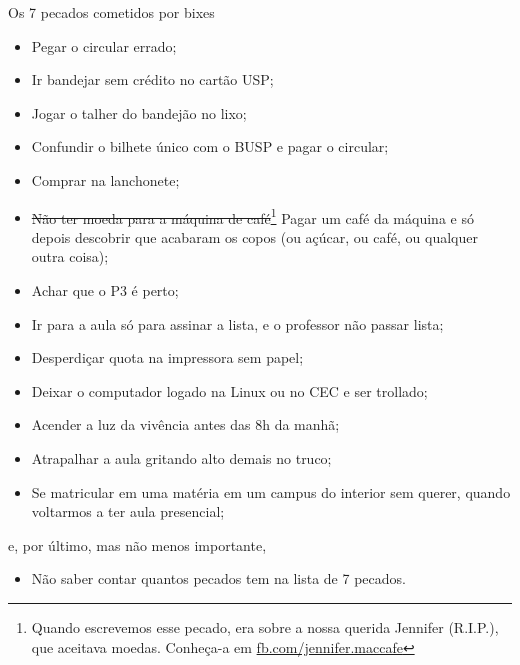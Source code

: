 \begin{editorial}{Os 7 pecados cometidos por bixes}
\begin{itemize}
  \item Pegar o circular errado;
  \item Ir bandejar sem crédito no cartão USP;
  \item Jogar o talher do bandejão no lixo;
  \item Confundir o bilhete único com o BUSP e pagar o circular;
  \item Comprar na lanchonete;
  \item \sout{Não ter moeda para a máquina de café}\footnote{Quando escrevemos
    esse pecado, era sobre a nossa querida Jennifer (R.I.P.), que aceitava
    moedas. Conheça-a em \url{fb.com/jennifer.maccafe}} Pagar um café da
    máquina e só depois descobrir que acabaram os copos (ou açúcar, ou café,
    ou qualquer outra coisa);
  \item Achar que o P3 é perto;
  \item Ir para a aula só para assinar a lista, e o professor não passar lista;
  \item Desperdiçar quota na impressora sem papel;
  \item Deixar o computador logado na Linux ou no CEC e ser trollado;
  \item Acender a luz da vivência antes das 8h da manhã;
  \item Atrapalhar a aula gritando alto demais no truco;
  \item Se matricular em uma matéria em um campus do interior sem querer, quando
        voltarmos a ter aula presencial;
\end{itemize}
e, por último, mas não menos importante,
\begin{itemize}
  \item Não saber contar quantos pecados tem na lista de 7 pecados.
\end{itemize}

\end{editorial}
